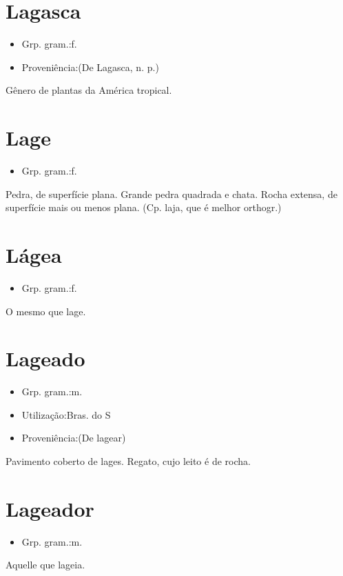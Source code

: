 \section{Lagasca}
\begin{itemize}
\item {Grp. gram.:f.}
\end{itemize}
\begin{itemize}
\item {Proveniência:(De \textunderscore Lagasca\textunderscore , n. p.)}
\end{itemize}
Gênero de plantas da América tropical.
\section{Lage}
\begin{itemize}
\item {Grp. gram.:f.}
\end{itemize}
Pedra, de superfície plana.
Grande pedra quadrada e chata.
Rocha extensa, de superfície mais ou menos plana.
(Cp. \textunderscore laja\textunderscore , que é melhor orthogr.)
\section{Lágea}
\begin{itemize}
\item {Grp. gram.:f.}
\end{itemize}
O mesmo que \textunderscore lage\textunderscore .
\section{Lageado}
\begin{itemize}
\item {Grp. gram.:m.}
\end{itemize}
\begin{itemize}
\item {Utilização:Bras. do S}
\end{itemize}
\begin{itemize}
\item {Proveniência:(De \textunderscore lagear\textunderscore )}
\end{itemize}
Pavimento coberto de lages.
Regato, cujo leito é de rocha.
\section{Lageador}
\begin{itemize}
\item {Grp. gram.:m.}
\end{itemize}
Aquelle que lageia.
